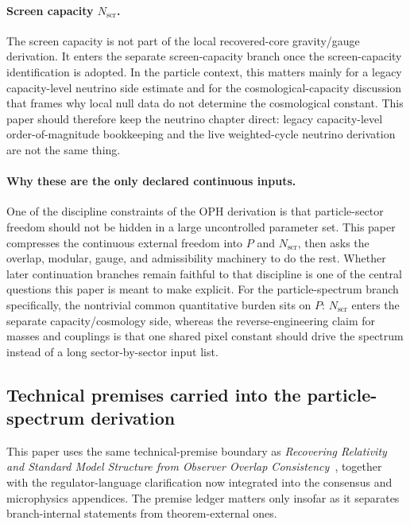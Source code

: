 \documentclass[11pt]{article}
\begin{document}
\paragraph{Screen capacity \(N_{\mathrm{scr}}\).}
The screen capacity is not part of the local recovered-core gravity/gauge derivation. It enters
the separate screen-capacity branch once the screen-capacity identification is adopted. In the
particle context, this matters mainly for a legacy capacity-level neutrino side estimate and for the
cosmological-capacity discussion that frames why local null data do not determine the
cosmological constant. This paper should therefore keep the neutrino chapter direct:
legacy capacity-level order-of-magnitude bookkeeping and the live weighted-cycle neutrino derivation are not the
same thing.

\paragraph{Why these are the only declared continuous inputs.}
One of the discipline constraints of the OPH derivation is that particle-sector freedom should not
be hidden in a large uncontrolled parameter set. This paper compresses the
continuous external freedom into \(P\) and \(N_{\mathrm{scr}}\), then asks the overlap,
modular, gauge, and admissibility machinery to do the rest. Whether later continuation branches
remain faithful to that discipline is one of the central questions this paper is meant to
make explicit. For the particle-spectrum branch specifically, the nontrivial common quantitative
burden sits on \(P\): \(N_{\mathrm{scr}}\) enters the separate capacity/cosmology side, whereas
the reverse-engineering claim for masses and couplings is that one shared pixel constant should
drive the spectrum instead of a long sector-by-sector input list.

\subsection{Technical premises carried into the particle-spectrum derivation}

This paper uses the same technical-premise boundary as
\emph{Recovering Relativity and Standard Model Structure from Observer Overlap Consistency}~\cite{ophcompact}, together with
the regulator-language clarification now integrated into the consensus and microphysics
appendices. The premise ledger matters only
insofar as it separates branch-internal statements from theorem-external ones.
\end{document}
